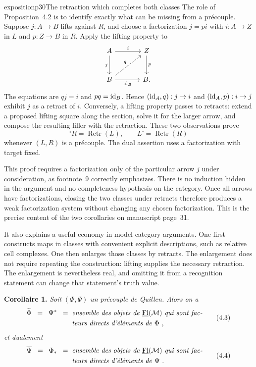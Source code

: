 \begin{dcomment}{exposition}{p30}{The retraction which completes both classes}
The role of Proposition~4.2 is to identify exactly what can be missing from a pr\'ecouple. Suppose $j:A\to B$ lifts against $R$, and choose a factorization $j=pi$ with $i:A\to Z$ in $L$ and $p:Z\to B$ in $R$. Apply the lifting property to
\[
\begin{tikzcd}[row sep=large,column sep=large]
A \arrow[r,"i"] \arrow[d,"j"'] & Z \arrow[d,"p"]\\
B \arrow[r,"\id_B"'] \arrow[ur,dashed,"q"] & B .
\end{tikzcd}
\]
The equations are $qj=i$ and $pq=\mathrm{id}_B$. Hence $(\mathrm{id}_A,q):j\to i$ and $(\mathrm{id}_A,p):i\to j$ exhibit $j$ as a retract of $i$. Conversely, a lifting property passes to retracts: extend a proposed lifting square along the section, solve it for the larger arrow, and compose the resulting filler with the retraction. These two observations prove
\[
{}^{\square}R=\operatorname{Retr}(L),\qquad
L^{\square}=\operatorname{Retr}(R)
\]
whenever $(L,R)$ is a pr\'ecouple. The dual assertion uses a factorization with target fixed.

This proof requires a factorization only of the particular arrow $j$ under consideration, as footnote~9 correctly emphasizes. There is no induction hidden in the argument and no completeness hypothesis on the category. Once all arrows have factorizations, closing the two classes under retracts therefore produces a weak factorization system without changing any chosen factorization. This is the precise content of the two corollaries on manuscript page~31.

It also explains a useful economy in model-category arguments. One first constructs maps in classes with convenient explicit descriptions, such as relative cell complexes. One then enlarges those classes by retracts. The enlargement does not require repeating the construction: lifting supplies the necessary retraction. The enlargement is nevertheless real, and omitting it from a recognition statement can change that statement's truth value.
\end{dcomment}


\textbf{Corollaire 1.} \textit{Soit} $(\Phi,\Psi)$ \textit{un précouple de Quillen. Alors on a}
\[
\begin{aligned}
\widetilde{\Phi} \;\;=\;\; \Psi^* \;\;=\;\; &\textit{ensemble des objets de } \underline{\mathrm{Fl}}(\mathcal{M}) \textit{ qui sont fac-}\\
&\textit{teurs directs d'éléments de } \Phi\ ,
\end{aligned}
\tag*{(4.3)}
\] %
\textit{et dualement}
\[
\begin{aligned}
\overline{\Psi} \;\;=\;\; \Phi_* \;\;=\;\; &\textit{ensemble des objets de } \underline{\mathrm{Fl}}(\mathcal{M}) \textit{ qui sont fac-}\\
&\textit{teurs directs d'éléments de } \Psi\ .
\end{aligned}
\tag*{(4.4)}
\] %

